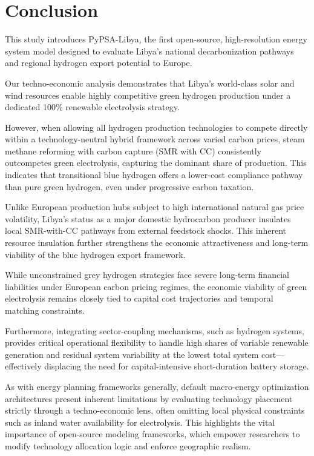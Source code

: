 \documentclass[preprint,12pt]{elsarticle}
\begin{document}
\section{Conclusion}
\label{sec:conclusion}

This study introduces \textsf{PyPSA-Libya}, the first open-source, high-resolution energy system model designed to evaluate Libya’s national decarbonization pathways and regional hydrogen export potential to Europe. 

Our techno-economic analysis demonstrates that Libya's world-class solar and wind resources enable highly competitive green hydrogen production under a dedicated 100\% renewable electrolysis strategy. 

However, when allowing all hydrogen production technologies to compete directly within a technology-neutral hybrid framework across varied carbon prices, steam methane reforming with carbon capture (SMR with CC) consistently outcompetes green electrolysis, capturing the dominant share of production. This indicates that transitional blue hydrogen offers a lower-cost compliance pathway than pure green hydrogen, even under progressive carbon taxation. 

Unlike European production hubs subject to high international natural gas price volatility, Libya's status as a major domestic hydrocarbon producer insulates local SMR-with-CC pathways from external feedstock shocks. This inherent resource insulation further strengthens the economic attractiveness and long-term viability of the blue hydrogen export framework.

While unconstrained grey hydrogen strategies face severe long-term financial liabilities under European carbon pricing regimes, the economic viability of green electrolysis remains closely tied to capital cost trajectories and temporal matching constraints. 

Furthermore, integrating sector-coupling mechanisms, such as hydrogen systems, provides critical operational flexibility to handle high shares of variable renewable generation and residual system variability at the lowest total system cost—effectively displacing the need for capital-intensive short-duration battery storage.

As with energy planning frameworks generally, default macro-energy optimization architectures present inherent limitations by evaluating technology placement strictly through a techno-economic lens, often omitting local physical constraints such as inland water availability for electrolysis. This highlights the vital importance of open-source modeling frameworks, which empower researchers to modify technology allocation logic and enforce geographic realism. 
\end{document}
